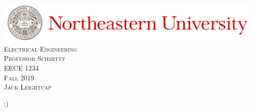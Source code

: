 \documentclass{article}
\newcommand\course{EECE 1234}
\newcommand\coursetitle{Electrical Engineering}
\newcommand\prof{Schmitty}
\newcommand\semester{Fall 2019}
\newcommand\name{Jack Leightcap}
\begin{document}
\begin{titlepage}
	\centering
	\includegraphics[width=\textwidth]{./Images/Header.jpeg}\\
	\vspace*{\fill}
	\textsc{\LARGE{\coursetitle}}\\[0.3cm]
	\textsc{\Large{Professor \prof}}\\[0.3cm]
	\textsc{\large{\course}}\\[0.3cm]
	\textsc{\large{\semester}}\\
	\vspace*{\fill}
	\textsc{\name}
\end{titlepage}
\thispagestyle{empty} 
\tableofcontents
\pagebreak
\setcounter{page}{1}
\pagestyle{fancy}

:)
\end{document}
